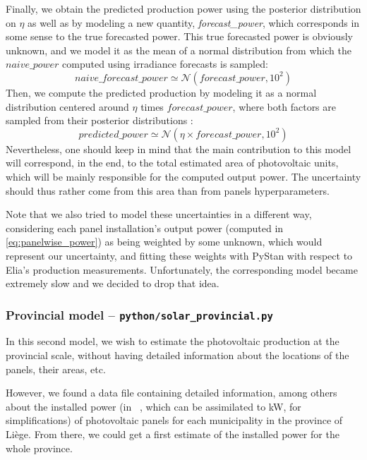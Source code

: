 \documentclass[a4paper, 12pt]{article}
\begin{document}
Finally, we obtain the predicted production power using the posterior distribution on $\eta$ as well as by modeling a new quantity, \emph{forecast\_power}, which corresponds in some sense to the true forecasted power. This true forecasted power is obviously unknown, and we model it as the mean of a normal distribution from which the $naive\_power$ computed using irradiance forecasts is sampled:
\begin{equation*}
    naive\_forecast\_power \simeq \mathcal{N}(forecast\_power, 10^2)
\end{equation*}
Then, we compute the predicted production by modeling it as a normal distribution centered around $\eta$ times $forecast\_power$, where both factors are sampled from their posterior distributions :
\begin{equation*}
    predicted\_power \simeq \mathcal{N}(\eta \times forecast\_power, 10^2)
\end{equation*}
Nevertheless, one should keep in mind that the main contribution to this model will correspond, in the end, to the total estimated area of photovoltaic units, which will be mainly responsible for the computed output power. The uncertainty should thus rather come from this area than from panels hyperparameters.

Note that we also tried to model these uncertainties in a different way, considering each panel installation's output power (computed in \ref{eq:panelwise_power}) as being weighted by some unknown, which would represent our uncertainty, and fitting these weights with PyStan with respect to Elia's production measurements. Unfortunately, the corresponding model became extremely slow and we decided to drop that idea.

\subsubsection{Provincial model -- \texttt{python/solar\_provincial.py}}
In this second model, we wish to estimate the photovoltaic production at the provincial scale, without having detailed information about the locations of the panels, their areas, etc. 

However, we found a data file containing detailed information, among others about the installed power (in \si{\kilo\voltampere}, which can be assimilated to \si{\kilo\watt}, for simplifications) of photovoltaic panels for each municipality in the province of Liège. From there, we could get a first estimate of the installed power for the whole province.
\end{document}

